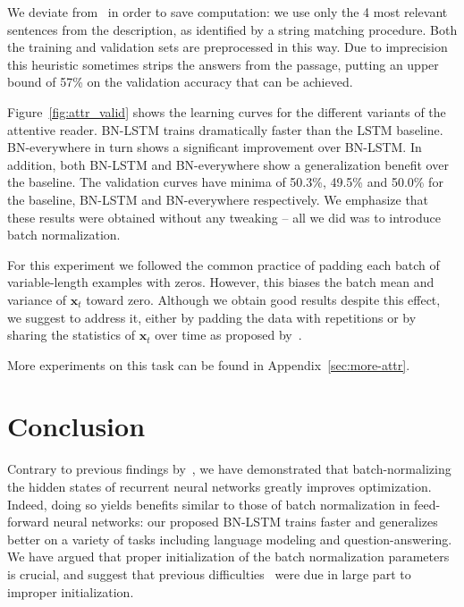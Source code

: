 \documentclass{article} %
\newcommand{\vect}[1]{\mathbf{#1}}
\begin{document}
We deviate from~\citet{attentivereader} in order to save computation:
we use only the 4 most relevant sentences from the description,
as identified by a string matching procedure.
Both the training and validation sets are preprocessed in this way.
Due to imprecision this heuristic sometimes strips the answers from the passage,
putting an upper bound of 57\% on the validation accuracy that can be achieved.

Figure~\ref{fig:attr_valid} shows the learning curves for the different variants of the attentive reader.
BN-LSTM trains dramatically faster than the LSTM baseline.
BN-everywhere in turn shows a significant improvement over BN-LSTM.
In addition, both BN-LSTM and BN-everywhere show a generalization benefit over the baseline.
The validation curves have minima of 50.3\%, 49.5\% and 50.0\% for the baseline, BN-LSTM and BN-everywhere respectively.
We emphasize that these results were obtained without any tweaking -- all we did was to introduce batch normalization.

For this experiment we followed the common practice of padding each batch of variable-length examples with zeros.
However, this biases the batch mean and variance of $\vect{x}_t$ toward zero.
Although we obtain good results despite this effect, we suggest to address it, either by padding the data with repetitions or by sharing the statistics of $\vect{x}_t$ over time as proposed by~\citet{cesar}.

More experiments on this task can be found in Appendix~\ref{sec:more-attr}.

\section{Conclusion}

Contrary to previous findings by~\citet{cesar,baidu},
we have demonstrated that batch-normalizing the hidden states of recurrent neural networks greatly improves optimization.
Indeed, doing so yields benefits similar to those of batch normalization in feed-forward neural networks:
our proposed BN-LSTM trains faster and generalizes better on a variety of tasks including language modeling and question-answering.
We have argued that proper initialization of the batch normalization parameters is crucial,
and suggest that previous difficulties~\citep{cesar, baidu} were due in large part to improper initialization.

\end{document}
